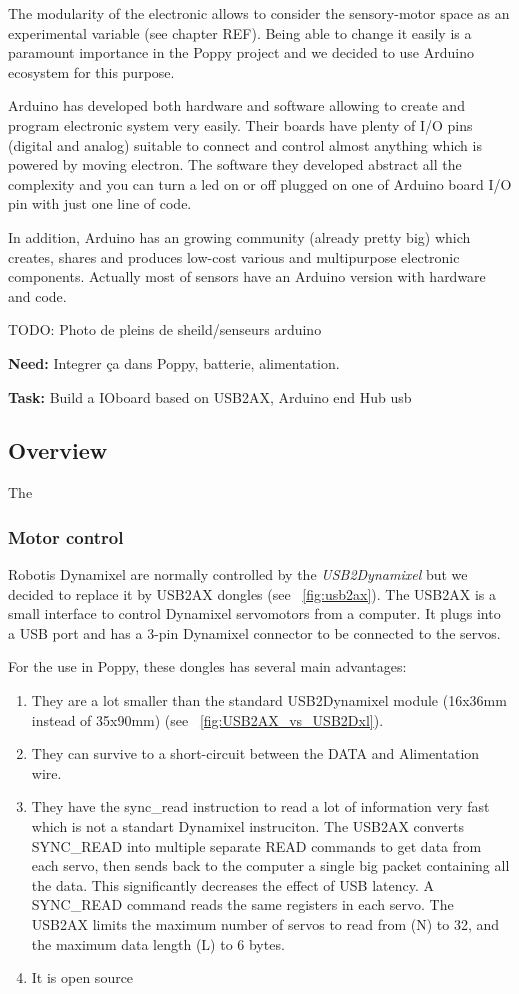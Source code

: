 The modularity of the electronic allows to consider the sensory-motor space as an experimental variable (see chapter REF). Being able to change it easily is a paramount importance in the Poppy project and we decided to use Arduino ecosystem for this purpose.

Arduino has developed both hardware and software allowing to create and program electronic system very easily. Their boards have plenty of I/O pins (digital and analog) suitable to connect and control almost anything which is powered by moving electron. The software they developed abstract all the complexity and you can turn a led on or off plugged on one of Arduino board I/O pin with just one line of code.

In addition, Arduino has an growing community (already pretty big) which creates, shares and produces low-cost various and multipurpose electronic components. Actually most of sensors have an Arduino version with hardware and code.

TODO: Photo de pleins de sheild/senseurs arduino


\textbf{Need:}
Integrer ça dans Poppy, batterie, alimentation.

\textbf{Task:}
Build a IOboard based on USB2AX, Arduino end Hub usb



\subsection{Overview} %

The

\subsubsection{Motor control} %
Robotis Dynamixel are normally controlled by the \emph{USB2Dynamixel} but we decided to replace it by USB2AX dongles (see \figurename~\ref{fig:usb2ax}). The USB2AX is a small interface to control Dynamixel servomotors from a computer. It plugs into a USB port and has a 3-pin Dynamixel connector to be connected to the servos.

For the use in Poppy, these dongles has several main advantages:
\begin{enumerate}
    \item They are a lot smaller than the standard USB2Dynamixel module (16x36mm instead of 35x90mm) (see \figurename~\ref{fig:USB2AX_vs_USB2Dxl}).
    \item They can survive to a short-circuit between the DATA and Alimentation wire.
    \item They have the sync\_read instruction to read a lot of information very fast which is not a standart Dynamixel instruciton. The USB2AX converts SYNC\_READ into multiple separate READ commands to get data from each servo, then sends back to the computer a single big packet containing all the data. This significantly decreases the effect of USB latency. A SYNC\_READ command reads the same registers in each servo. The USB2AX limits the maximum number of servos to read from (N) to 32, and the maximum data length (L) to 6 bytes.
    \item It is open source
\end{enumerate}

